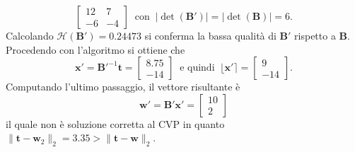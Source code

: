 \begin{exmp}
\[        \begin{bmatrix}
            12 & 7\\
            -6 & -4
        \end{bmatrix}
        \ \text{ con } \ |\det(\mathbf{B}')| = |\det(\mathbf{B})| = 6.
    \]
    Calcolando $\mathcal{H}(\mathbf{B}') = 0.24473$ si conferma la bassa qualità di $\mathbf{B}'$ 
    rispetto a $\mathbf{B}$. Procedendo con l'algoritmo si ottiene che 
    \[
    \mathbf{x}' = \mathbf{B}'^{-1}\mathbf{t}=
    \begin{bmatrix}
        8.75\\
        -14
    \end{bmatrix}
    \ \text{ e quindi } \ \lfloor\mathbf{x}'\rceil = 
    \begin{bmatrix}
        9\\
        -14
    \end{bmatrix}.
    \]
    Computando l'ultimo passaggio, il vettore risultante è
    \[
        \mathbf{w}' = \mathbf{B}'\mathbf{x}' =
        \begin{bmatrix}
            10\\
            2
        \end{bmatrix}
    \]
    il quale non è soluzione corretta al CVP in quanto 
    $\|\mathbf{t}-\mathbf{w}_2\|_2 = 3.35 > \|\mathbf{t}-\mathbf{w}\|_2$. 
\end{exmp}


